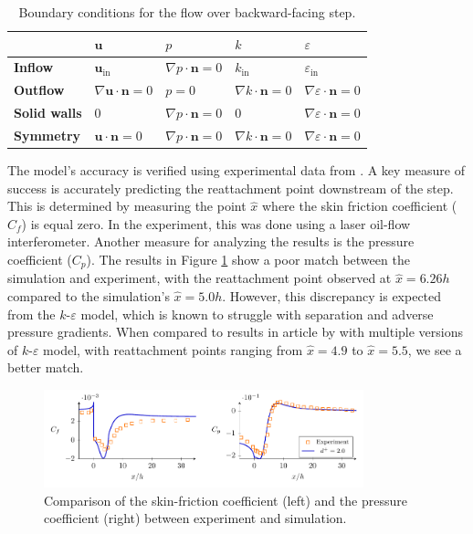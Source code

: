 \begin{table}
    \centering
    \begin{tabular}{m{2.1cm} m{1.75cm} m{1.75cm} m{1.75cm} m{1.75cm}}
        \hline
        & $\mathbf{u}$ & $p$ & $k$ & $\varepsilon$ \\
        \hline
        \textbf{Inflow} & $\mathbf{u}_{\text{in}}$ & $\nabla p \cdot \mathbf{n} = 0$
        & $k_{\text{in}}$ & $\varepsilon_{\text{in}}$
        \\
        \textbf{Outflow} & $\nabla \mathbf{u} \cdot \mathbf{n} = 0$ & $p=0$ 
        & $\nabla k \cdot \mathbf{n} = 0$ & $\nabla \varepsilon\cdot \mathbf{n} = 0$
        \\
        \textbf{Solid walls} & $0$ & $\nabla p \cdot \mathbf{n} = 0$ 
        & $0$ & $\nabla \varepsilon \cdot \mathbf{n} = 0$
        \\
        \textbf{Symmetry} & $\mathbf{u} \cdot \mathbf{n} = 0$ & $\nabla p \cdot \mathbf{n} = 0$ 
         & $\nabla k \cdot \mathbf{n} = 0$ & $\nabla \varepsilon \cdot \mathbf{n} = 0$
        \\
        \hline
    \end{tabular}
    \captionsetup{width=0.85\textwidth}
    \caption{Boundary conditions for the flow over backward-facing step.}
    \label{tab: boundary conditions for the backward facing step}
\end{table}

The model's accuracy is verified using experimental data from \cite{driver_features_1985}. A key measure of success is accurately predicting the reattachment point downstream of the step. This is determined by measuring the point \(\hat{x}\) where the skin friction coefficient (\(C_f\)) is equal zero. In the experiment, this was done using a laser oil-flow interferometer. Another measure for analyzing the results is the pressure coefficient (\(C_p\)). The results in Figure \ref{fig: backstep coefficients} show a poor match between the simulation and experiment, with the reattachment point observed at \(\hat{x} = 6.26 h\) compared to the simulation's \(\hat{x} = 5.0 h\). However, this discrepancy is expected from the \(k\)-\(\varepsilon\) model, which is known to struggle with separation and adverse pressure gradients. When compared to results in article by \cite{steffen_jr._critical_1993} with multiple versions of \(k\)-\(\varepsilon\) model, with reattachment points ranging from \(\hat{x} = 4.9\) to \(\hat{x} = 5.5\), we see a better match.

\begin{figure}[htbp]
    \centering
    \includegraphics[width=0.825\textwidth]{backstep-coefficients.pdf}
    \captionsetup{width=0.85\textwidth}
    \caption{Comparison of the skin-friction coefficient (left) and the pressure coefficient (right) between experiment and simulation.}
    \label{fig: backstep coefficients}
\end{figure}

